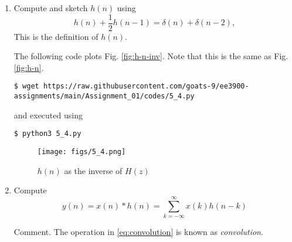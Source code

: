 \documentclass[journal,12pt,twocolumn]{IEEEtran}
\renewcommand\thesection{\arabic{section}}
\begin{document}
\begin{enumerate}[label=\thesection.\arabic*]
\item 
Compute and sketch $h(n)$ using 
\begin{equation}
\label{eq:iir_filter_h}
h(n) + \frac{1}{2}h(n-1) = \delta(n) + \delta(n-2), 
\end{equation}
This is the definition of $h(n)$.

\solution The following code plots Fig. \eqref{fig:h-n-inv}. Note that this is
the same as Fig. \eqref{fig:h-n}.
\begin{lstlisting}
$ wget https://raw.githubusercontent.com/goats-9/ee3900-assignments/main/Assignment_01/codes/5_4.py
\end{lstlisting}
and executed using
\begin{lstlisting}
$ python3 5_4.py
\end{lstlisting}

\begin{figure}[!ht]
	\centering
	\texttt{[image: figs/5\_4.png]}
	\caption{$h(n)$ as the inverse of $H(z)$}
	\label{fig:h-n-inv}
\end{figure}
\item Compute 
\begin{equation}
\label{eq:convolution}
y(n) = x(n)*h(n) = \sum_{k=-\infty}^{\infty}x(k)h(n-k)
\end{equation}

Comment. The operation in \eqref{eq:convolution} is known as
{\em convolution}.


\end{enumerate}
\end{document}
